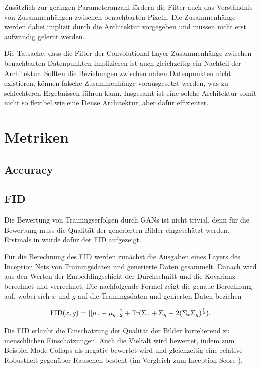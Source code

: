 Zusätzlich zur geringen Parameteranzahl fördern die Filter auch das Verständnis von Zusammenhängen zwischen benachbarten Pixeln.
Die Zusammenhänge werden dabei implizit durch die Architektur vorgegeben und müssen nicht erst aufwändig gelernt werden.
\newline

Die Tatsache, dass die Filter der Convolutional Layer Zusammenhänge zwischen benachbarten Datenpunkten implizieren ist auch gleichzeitig ein Nachteil der Architektur.
Sollten die Beziehungen zwischen nahen Datenpunkten nicht existieren, können falsche Zusammenhänge vorausgesetzt werden, was zu schlechteren Ergebnissen führen kann.
Insgesamt ist eine solche Architektur somit nicht so flexibel wie eine Dense Architektur, aber dafür effizienter.

\section{Metriken}
\subsection{Accuracy}
\subsection{FID}	
Die Bewertung von Trainingserfolgen durch GANs ist nicht trivial, denn für die Bewertung muss die Qualität der generierten Bilder eingeschätzt werden.
Erstmals in \cite{fid} wurde dafür der \acrfull{FID} aufgezeigt.

Für die Berechnung des \acrshort{FID} werden zunächst die Ausgaben eines Layers des Inception Nets von Trainingsdaten und generierte Daten gesammelt.
Danach wird aus den Werten der Embeddingschicht der Durchschnitt und die Kovarianz berechnet und verrechnet.
Die nachfolgende Formel \cite{are-gans-created-equally} zeigt die genaue Berechnung auf, wobei sich $x$ und $g$ auf die Trainingsdaten und genierten Daten beziehen

\begin{equation}
	\operatorname{FID}(x, g) = ||\mu_x - \mu_g||_2^2 + \operatorname{Tr}(\Sigma_x + \Sigma_g - 2(\Sigma_x \Sigma_g)^{\frac{1}{2}}).
\end{equation}

Die \acrshort{FID} erlaubt die Einschätzung der Qualität der Bilder korrelierend zu menschlichen Einschätzungen.
Auch die Vielfalt wird bewertet, indem zum Beispiel Mode-Collaps als negativ bewertet wird und gleichzeitig eine relative Robustheit gegenüber Rauschen besteht (im Vergleich zum Inception Score \cite{are-gans-created-equally}). 

